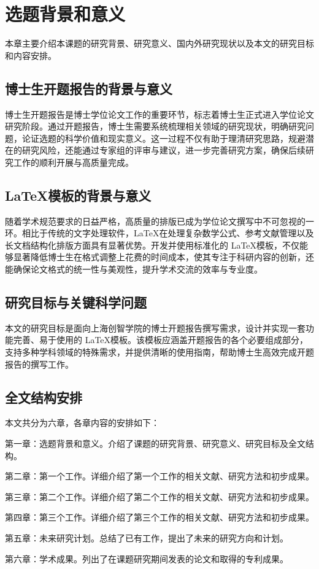 \chapter{选题背景和意义}%
\label{chap:background}

本章主要介绍本课题的研究背景、研究意义、国内外研究现状以及本文的研究目标和内容安排。

\section{博士生开题报告的背景与意义}

博士生开题报告是博士学位论文工作的重要环节，标志着博士生正式进入学位论文研究阶段。通过开题报告，博士生需要系统梳理相关领域的研究现状，明确研究问题，论证选题的科学价值和现实意义。这一过程不仅有助于理清研究思路，规避潜在的研究风险，还能通过专家组的评审与建议，进一步完善研究方案，确保后续研究工作的顺利开展与高质量完成。

\section{\LaTeX 模板的背景与意义}

随着学术规范要求的日益严格，高质量的排版已成为学位论文撰写中不可忽视的一环。相比于传统的文字处理软件，\LaTeX 在处理复杂数学公式、参考文献管理以及长文档结构化排版方面具有显著优势。开发并使用标准化的 \LaTeX 模板，不仅能够显著降低博士生在格式调整上花费的时间成本，使其专注于科研内容的创新，还能确保论文格式的统一性与美观性，提升学术交流的效率与专业度。

\section{研究目标与关键科学问题}

本文的研究目标是面向上海创智学院的博士开题报告撰写需求，设计并实现一套功能完善、易于使用的 \LaTeX 模板。该模板应涵盖开题报告的各个必要组成部分，支持多种学科领域的特殊需求，并提供清晰的使用指南，帮助博士生高效完成开题报告的撰写工作。


\section{全文结构安排}

本文共分为六章，各章内容的安排如下：

第一章：选题背景和意义。介绍了课题的研究背景、研究意义、研究目标及全文结构。

第二章：第一个工作。详细介绍了第一个工作的相关文献、研究方法和初步成果。

第三章：第二个工作。详细介绍了第二个工作的相关文献、研究方法和初步成果。

第四章：第三个工作。详细介绍了第三个工作的相关文献、研究方法和初步成果。

第五章：未来研究计划。总结了已有工作，提出了未来的研究方向和计划。

第六章：学术成果。列出了在课题研究期间发表的论文和取得的专利成果。